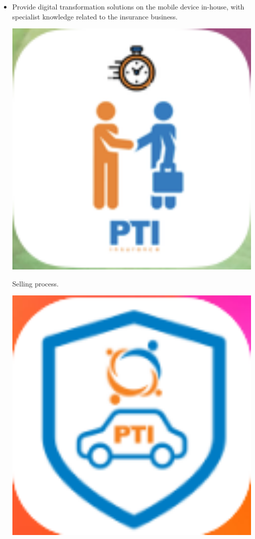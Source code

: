 \documentclass[margin, 10pt]{res}
\begin{document}
\begin{resume}
   \begin{itemize}
	\item Provide digital transformation solutions on the mobile device in-house, with specialist knowledge related to the insurance business.
	\\\begin{minipage}[l]{0.1\linewidth}
	\includegraphics[width=1\textwidth]{image/portal1.png}
	\end{minipage}\hspace{0.2cm}Selling process.
	\\\begin{minipage}[l]{0.1\linewidth}
	\includegraphics[width=1\textwidth]{image/gdv1.png}

\end{minipage}
\end{itemize}
\end{resume}
\end{document}
